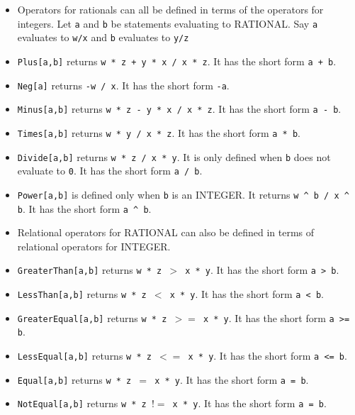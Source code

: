 \begin{itemize}
\item
Operators for rationals can all be defined in terms of the operators
for integers.  Let \verb+a+ and \verb+b+ be statements evaluating to
RATIONAL. Say \verb+a+ evaluates to \verb+w/x+ and \verb+b+ evaluates
to \verb+y/z+

\bd
\item
\verb+Plus[a,b]+ returns \verb&w * z + y * x / x * z&. It has the
short form \verb&a + b&.  
 
\item
\verb+Neg[a]+ returns \verb+-w / x+.  It has the short form \verb&-a&.  
 
\item
\verb+Minus[a,b]+ returns \verb+w * z - y * x / x * z+.  
It has the short form \verb&a - b&.  

\item
\verb+Times[a,b]+ returns \verb+w * y / x * z+.  It has the short form 
\verb+a * b+.

\item
\verb+Divide[a,b]+ returns \verb+w * z / x * y+. It is only defined
when \verb+b+ does not evaluate to \verb+0+.  It has the
short form \verb+a / b+.
\item 
\verb+Power[a,b]+ is defined only when \verb+b+ is an INTEGER.  It 
returns \verb+w ^ b / x ^ b+.  It has the short form \verb+a ^ b+.

\ed
\item
Relational operators for RATIONAL can also be defined in terms of
relational operators for INTEGER.  
\bd
\item
\verb+GreaterThan[a,b]+ returns \verb+w * z +$>$\verb+ x * y+.
It has the short form \verb+a > b+.

\item
\verb+LessThan[a,b]+ returns \verb+w * z +$<$\verb+ x * y+.
It has the short form \verb+a < b+.

\item
\verb+GreaterEqual[a,b]+ returns \verb+w * z +$>=$\verb+ x * y+.
It has the short form \verb+a >= b+.

\item
\verb+LessEqual[a,b]+ returns \verb+w * z +$<=$\verb+ x * y+.
It has the short form \verb+a <= b+.

\item
\verb+Equal[a,b]+ returns \verb+w * z +$=$\verb+ x * y+.
It has the short form \verb+a = b+.

\item
\verb+NotEqual[a,b]+ returns \verb+w * z +$!=$\verb+ x * y+.
It has the short form \verb+a = b+.
\ed
\end{itemize}


